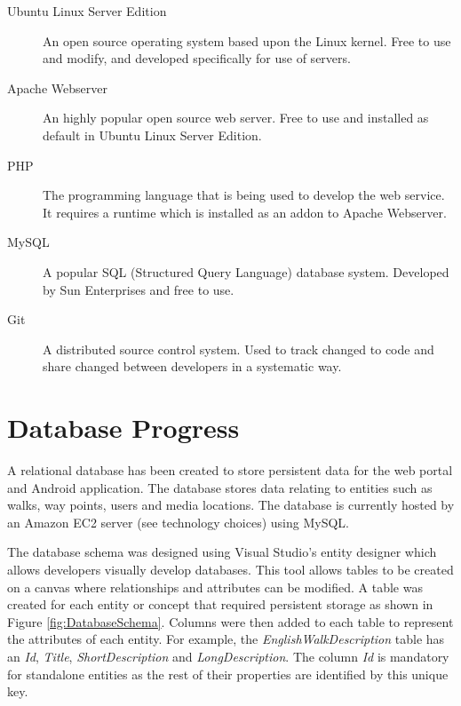 \documentclass[11pt,a4paper]{article}
\begin{document}
\begin{description}
\item[Ubuntu Linux Server Edition] An open source operating system based upon the Linux kernel. Free to use and modify, and developed specifically for use of servers. 

\item[Apache Webserver] An highly popular open source web server. Free to use and installed as default in Ubuntu Linux Server Edition.

\item[PHP] The programming language that is being used to develop the web service. It requires a runtime which is installed as an addon to Apache Webserver. 

\item[MySQL] A popular SQL (Structured Query Language) database system. Developed by Sun Enterprises and free to use. 

\item[Git] A distributed source control system. Used to track changed to code and share changed between developers in a systematic way. 
\end{description}


\section{Database Progress}

A relational database has been created to store persistent data for the web portal and Android application.
The database stores data relating to entities such as walks, way points, users and media locations.
The database is currently hosted by an Amazon EC2 server (see technology choices) using MySQL.

The database schema was designed using Visual Studio's entity designer which allows developers visually develop databases.
This tool allows tables to be created on a canvas where relationships and attributes can be modified.
A table was created for each entity or concept that required persistent storage as shown in Figure \ref{fig:DatabaseSchema}.
Columns were then added to each table to represent the attributes of each entity.
For example, the \emph{EnglishWalkDescription} table has an \emph{Id}, \emph{Title}, \emph{ShortDescription} and \emph{LongDescription}. The column \emph{Id} is mandatory for standalone entities as the rest of their properties are identified by this unique key. 
\end{document}

